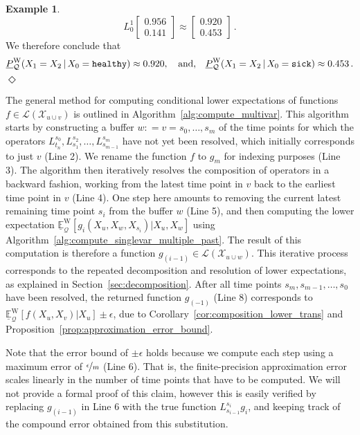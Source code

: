 \documentclass[10pt,a4paper]{paper}
\theoremstyle{definition}
\newtheorem{exmp}{Example}%
\newcommand{\states}{\mathcal{X}}
\newcommand{\gambles}{\mathcal{L}}
\newcommand{\rateset}{\mathcal{Q}}
\newcommand{\coloneqq}{:\!=}
\newcommand{\exampleend}{\hfill$\Diamond$}
\begin{document}
\begin{exmp}
\begin{equation*}
L_0^1\left[\begin{array}{c}
0.956 \\
0.141
\end{array}\right] \approx \left[\begin{array}{c}
0.920 \\
0.453
\end{array}\right]\,.
\end{equation*}
We therefore conclude that
\begin{align*}
\underline{P}_{\rateset}^{\mathrm{W}}(X_1 = X_2\,\vert\,X_0=\text{{\tt healthy}}) \approx 0.920,\quad\text{and,}\quad \underline{P}_{\rateset}^{\mathrm{W}}(X_1 = X_2\,\vert\,X_0=\text{{\tt sick}}) \approx 0.453\,.
\end{align*}
\exampleend
\end{exmp}

The general method for computing conditional lower expectations of functions $f\in\gambles(\states_{u\cup v})$ is outlined in Algorithm~\ref{alg:compute_multivar}. This algorithm starts by constructing a buffer $w\coloneqq v=s_0,\ldots,s_m$ of the time points for which the operators $L_{t_n}^{s_0},L_{s_1}^{s_2},\ldots,L_{s_{m-1}}^{s_m}$ have not yet been resolved, which initially corresponds to just $v$ (Line 2). We rename the function $f$ to $g_m$ for indexing purposes (Line 3). The algorithm then iteratively resolves the composition of operators in a backward fashion, working from the latest time point in $v$ back to the earliest time point in $v$ (Line 4). One step here amounts to removing the current latest remaining time point $s_i$ from the buffer $w$ (Line 5), and then computing the lower expectation $\underline{\mathbb{E}}_{\rateset}^\mathrm{W}[g_i(X_u,X_w,X_{s_i})\vert X_u,X_w]$ using Algorithm~\ref{alg:compute_singlevar_multiple_past}. The result of this computation is therefore a function $g_{(i-1)}\in\gambles(\states_{u\cup w})$. This iterative process corresponds to the repeated decomposition and resolution of lower expectations, as explained in Section~\ref{sec:decomposition}. After all time points $s_m,s_{m-1},\ldots,s_0$ have been resolved, the returned function $g_{(-1)}$ (Line 8) corresponds to $\underline{\mathbb{E}}_{\rateset}^\mathrm{W}[f(X_u,X_v)\vert X_u]\pm\epsilon$, due to Corollary~\ref{cor:composition_lower_trans} and Proposition~\ref{prop:approximation_error_bound}.

Note that the error bound of $\pm\epsilon$ holds because we compute each step using a maximum error of $\nicefrac{\epsilon}{m}$ (Line 6). That is, the finite-precision approximation error scales linearly in the number of time points that have to be computed. We will not provide a formal proof of this claim, however this is easily verified by replacing $g_{(i-1)}$ in Line 6 with the true function $L_{s_{i-1}}^{s_i}g_i$, and keeping track of the compound error obtained from this substitution.
\end{document}
